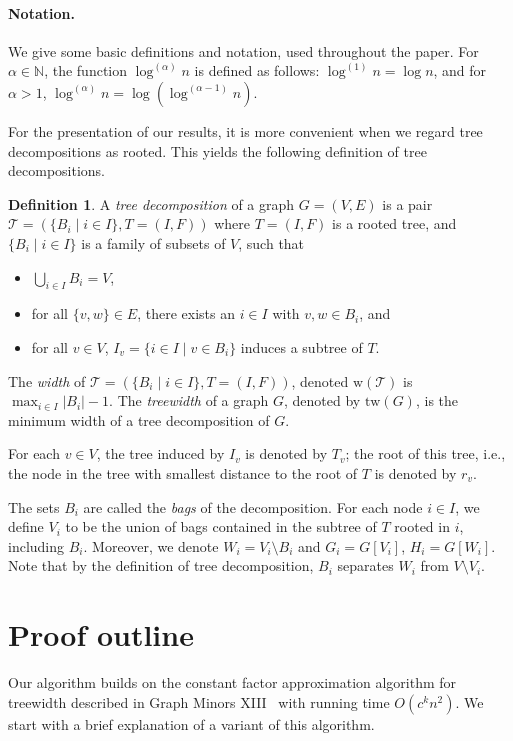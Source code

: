 \documentclass[a4paper,11pt]{article}
\theoremstyle{definition}
\newtheorem{definition}[lemma]{Definition}
\theoremstyle{remark}
\newcommand{\depth}{\alpha}
\newcommand{\td}{\mathcal{T}} \newcommand{\tw}{\mathrm{tw}} \newcommand{\w}{\mathrm{w}}
\begin{document}
\paragraph{Notation.}
We give some basic definitions and notation, used throughout the paper.  For
$\depth \in \mathbb{N}$, the function $\log^{(\depth)} n$ is defined
as follows: $\log^{(1)} n = \log n$, and for $\depth > 1$,
$\log^{(\depth)} n = \log (\log^{(\depth-1)} n)$.

For the presentation of our results, it is more convenient when we
regard tree decompositions as rooted.  This yields the following
definition of tree decompositions.
\begin{definition}
  \label{def:prelim:treewidth}
  A \emph{tree decomposition} of a graph $G=(V,E)$ is a pair $\td =
  (\{B_i \mid i \in I\}, T=(I,F))$ where $T=(I,F)$ is a rooted tree,
  and $\{B_i \mid i \in I\}$ is a family of subsets of $V$, such that
  \begin{itemize}
  \item $\bigcup_{i\in I} B_i = V$,
  \item for all $\{v,w\}\in E$, there exists an $i\in I$ with $v,w\in B_i$,
    and
  \item for all $v\in V$, $I_v = \{i\in I \mid v \in B_i \}$ induces a
    subtree of $T$.
  \end{itemize}
  The \emph{width} of $\td = (\{B_i \mid i\in I\}, T=(I,F))$, denoted
  $\w(\td)$ is $\max_{i\in I} |B_i|-1$.  The \emph{treewidth} of a
  graph $G$, denoted by $\tw(G)$, is the minimum width of a tree
  decomposition of $G$.
\end{definition}
For each $v \in V$, the tree induced by $I_v$ is denoted by $T_v$; the
root of this tree, i.e., the node in the tree with smallest distance
to the root of $T$ is denoted by $r_v$.

The sets $B_i$ are called the \emph{bags} of the decomposition.  For
each node $i \in I$, we define $V_i$ to be the union of bags contained
in the subtree of $T$ rooted in $i$, including $B_i$.  Moreover, we
denote $W_i = V_i\setminus B_i$ and $G_i = G[V_i]$, $H_i = G[W_i]$.
Note that by the definition of tree decomposition, $B_i$ separates
$W_i$ from $V\setminus V_i$.


\section{Proof outline}
\label{sec:outline}
Our algorithm builds on the constant factor approximation algorithm
for treewidth described in Graph Minors XIII~\cite{RobertsonS13} with
running time $O(c^kn^2)$.  We start with a brief explanation of a
variant of this algorithm.
\end{document}
